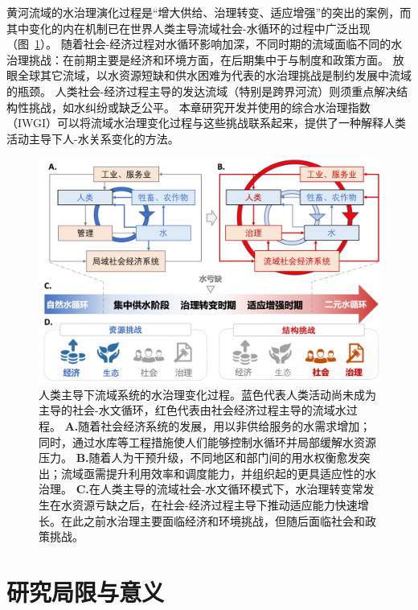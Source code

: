 黄河流域的水治理演化过程是“增大供给、治理转变、适应增强”的突出的案例，而其中变化的内在机制已在世界人类主导流域社会-水循环的过程中广泛出现（图~\ref{fig:summary}）。
随着社会-经济过程对水循环影响加深，不同时期的流域面临不同的水治理挑战：在前期主要是经济和环境方面，在后期集中于与制度和政策方面。
放眼全球其它流域，以水资源短缺和供水困难为代表的水治理挑战是制约发展中流域的瓶颈\cite{allan2019,speed2013,liu2012a}。
人类社会-经济过程主导的发达流域（特别是跨界河流）则须重点解决结构性挑战，如水纠纷或缺乏公平\cite{mirumachi2015}。
本章研究开发并使用的综合水治理指数（IWGI）可以将流域水治理变化过程与这些挑战联系起来，提供了一种解释人类活动主导下人-水关系变化的方法。

\begin{figure}[htbp!]
	\includegraphics[width=\textwidth]{img/ch4/ch4_transition.png}
	\caption[人类主导下流域系统的水治理阶段过渡]{
		人类主导下流域系统的水治理变化过程。蓝色代表人类活动尚未成为主导的社会-水文循环，红色代表由社会经济过程主导的流域水过程。
        \textbf{A.}随着社会经济系统的发展，用以非供给服务的水需求增加；同时，通过水库等工程措施使人们能够控制水循环并局部缓解水资源压力。
        \textbf{B.}随着人为干预升级，不同地区和部门间的用水权衡愈发突出；流域亟需提升利用效率和调度能力，并组织起的更具适应性的水治理。
        \textbf{C.}在人类主导的流域社会-水文循环模式下，水治理转变常发生在水资源亏缺之后，在社会-经济过程主导下推动适应能力快速增长。在此之前水治理主要面临经济和环境挑战，但随后面临社会和政策挑战。
	}\label{fig:summary}
\end{figure}

\section{研究局限与意义}

